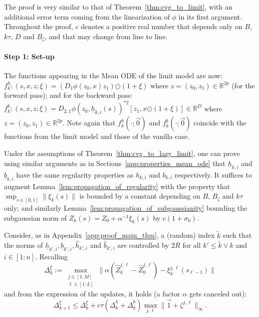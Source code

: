 \documentclass[a4paper,11pt]{article}
\newcommand{\R}{\mathbb{R}}
\newcommand{\1}{\mathbbm{1}}
\theoremstyle{definition}
\theoremstyle{remark}
\begin{document}
The proof is very similar to that of Theorem~\ref{thm:cvg_to_limit}, with an additional error term coming from the linearization of $\phi$ in its first argument. Throughout the proof, $c$ denotes a positive real number that depends only on $B$, $k\tau$, $D$ and $B_\zeta$, and that may change from line to line.

\paragraph{Step 1: Set-up} The functions appearing in the Mean ODE of the limit model are now:
$f_k^h : (s,x,z{;\xi}) = (D_1\phi(z_0,x)z_1){\odot (1+\xi)}$ where $z = (z_0,z_1) \in \R^{2p}$ (for the forward pass); and for the backward pass: $f_k^b : (s,x,z{;\xi}) = D_{2,1}\phi(z_0,\underline{h}_{k,i}(s))^{*2}[z_1,x{\odot(1+\xi)}] \in \R^{D}$ where $z = (z_0,z_1) \in \R^{2p}$. 
Note again that ${f_k^h(\cdot; \vec{0})}$ and ${f_k^b(\cdot;\vec{0})}$ coincide with the functions from the limit model and those of the vanilla case.

Under the assumptions of Theorem~\ref{thm:cvg_to_lazy_limit}, one can prove using similar arguments as in Sections~\ref{app:properties_mean_ode} that $\underline{h}_{k,i}$ and $\underline{b}_{k,i}$ have the same regularity properties as $h_{k,i}$ and $b_{k,i}$ respectively. It suffices to augment Lemma~\ref{lem:propagation_of_regularity} with the property that $\sup_{s \in [0,1]} \|\xi_k(s)\|$ is bounded by a constant depending on $B$, {$B_\zeta$} and $k\tau$ only; and similarly Lemma~\ref{lem:propagation_of_subgaussianity} bounding the subgaussian norm of $Z_k(s) = Z_0 + \alpha^{-1}\xi_k(s)$ by $c{(1+\sigma_0)}$.

Consider, as in Appendix~\ref{app:proof_main_thm}, a (random) index $\tilde{k}$ such that the norms of $\underline{h}_{k',i}, \underline{b}_{k',i}, \hat{h}_{k',i}$ and $\hat{b}_{k',i}$ are controlled by $2R$ for all $k' \le \tilde{k} \vee k$ and $i \in [1:n]$. Recalling
\[
    \Delta_k^\xi := \max_{\substack{j \in [1:M] \\ \ell \in [1:L]}} \|\alpha(\hat{Z}_k^{j,\ell} - \hat{Z}_0^{j,\ell}) - \xi_k^{j,\ell}(s_{\ell-1})\|
\]
and from the expression of the updates, it holds (a factor $\alpha$ gets canceled out):
\begin{equation}\label{eq:update_bound_lazy}
    \Delta_{k+1}^\xi \le \Delta_k^\xi + c\tau(\Delta_k^{\underline{h}} + \Delta_k^{\underline{b}}) \max_{j,\ell}\|\vec{1}+\zeta^{j,\ell}\|_{{\infty}}.
\end{equation}
\end{document}
